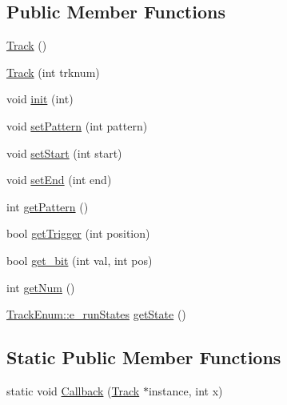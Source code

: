\subsection*{Public Member Functions}
\begin{DoxyCompactItemize}
\item 
\hyperlink{classTrack_a11457bcda8be04595018c11173d8241c}{Track} ()
\item 
\hyperlink{classTrack_a5291eda10a92ff293b2da574a6b2b2ff}{Track} (int trknum)
\item 
void \hyperlink{classTrack_a071791bec71a2e5123a7ec1799aeda90}{init} (int)
\item 
void \hyperlink{classTrack_a5d7970d57da301c815e296b93b44c2c0}{set\-Pattern} (int pattern)
\item 
void \hyperlink{classTrack_a114fb0b96827d1f04f102b6f7a93dd4c}{set\-Start} (int start)
\item 
void \hyperlink{classTrack_ad2facba2a6b0ce50633c6ed07ecc8612}{set\-End} (int end)
\item 
int \hyperlink{classTrack_a061ef050f72c8bc1b8f1c8408d0ffa70}{get\-Pattern} ()
\item 
bool \hyperlink{classTrack_a2e647f234c7eec18811d9ef778f4a1ab}{get\-Trigger} (int position)
\item 
bool \hyperlink{classTrack_af1857c36bb7d003ad412565d8d5f2978}{get\-\_\-bit} (int val, int pos)
\item 
int \hyperlink{classTrack_a387659a81cee50dd6346d610f9e42748}{get\-Num} ()
\item 
\hyperlink{namespaceTrackEnum_a5f3ef7d4b42d1778e4440dc0aaa149f8}{Track\-Enum\-::e\-\_\-run\-States} \hyperlink{classTrack_a05542f8f3dd812b721437f6aa7bafcc2}{get\-State} ()
\end{DoxyCompactItemize}
\subsection*{Static Public Member Functions}
\begin{DoxyCompactItemize}
\item 
static void \hyperlink{classTrack_a518d81eacc4e7c2f0ef9e25c628ab3f0}{Callback} (\hyperlink{classTrack}{Track} $\ast$instance, int x)
\end{DoxyCompactItemize}


